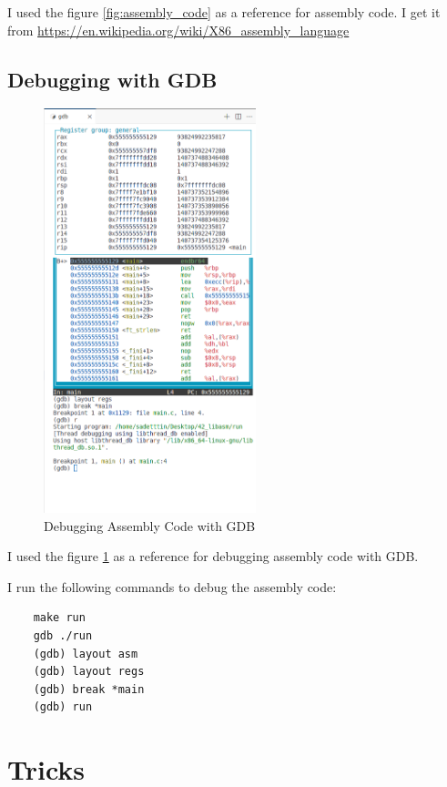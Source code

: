 \documentclass{article}
\begin{document}
I used the figure \ref{fig:assembly_code} as a reference for assembly code. I get it from \url{https://en.wikipedia.org/wiki/X86_assembly_language}

\subsection{Debugging with GDB}

\begin{figure}[H]
    \centering
    \includegraphics[width=0.55\textwidth]{gdb_assembly.png}
    \caption{Debugging Assembly Code with GDB}
    \label{fig:gdb_assembly}
\end{figure}

I used the figure \ref{fig:gdb_assembly} as a reference for debugging assembly code with GDB.

I run the following commands to debug the assembly code:
\begin{verbatim}
    make run
    gdb ./run
    (gdb) layout asm
    (gdb) layout regs
    (gdb) break *main
    (gdb) run
\end{verbatim}

\section{Tricks}
\end{document}
